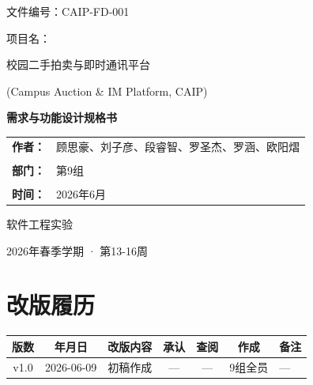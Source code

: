 \documentclass[12pt,a4paper]{ctexart}
\numberwithin{figure}{section}
\numberwithin{table}{section}
\begin{document}
\begin{titlepage}
\thispagestyle{empty}
\begin{center}

\vspace*{2cm}

{ 文件编号：CAIP-FD-001}

\vspace{2cm}

{\heiti 项目名：}

\vspace{0.5cm}

{\heiti 校园二手拍卖与即时通讯平台}

\vspace{0.3cm}

{\heiti (Campus Auction \& IM Platform, CAIP)}

\vspace{2cm}

{\bfseries\heiti 需求与功能设计规格书}

\vspace{3cm}

{
\begin{tabular}{rl}
\textbf{作者：} & 顾思豪、刘子彦、段睿智、罗圣杰、罗涵、欧阳熠 \\
& \\
\textbf{部门：} & 第9组 \\
& \\
\textbf{时间：} & 2026年6月 \\
\end{tabular}
}

\vspace{2cm}

{\heiti 软件工程实验}

\vfill

{ 2026年春季学期 · 第13-16周}

\end{center}
\end{titlepage}

\newpage
\section*{\centering 改版履历}

\vspace{1em}

\begin{center}
\renewcommand{\arraystretch}{1.5}
\begin{tabular}{|c|c|p{6cm}|c|c|c|p{3cm}|}
\hline
\rowcolor{tableheader}
\textbf{版数} & \textbf{年月日} & \textbf{改版内容} & \textbf{承认} & \textbf{查阅} & \textbf{作成} & \textbf{备注} \\
\hline
v1.0 & 2026-06-09 & 初稿作成 & --- & --- & 9组全员 & --- \\
\hline
\end{tabular}
\end{center}
\end{document}
